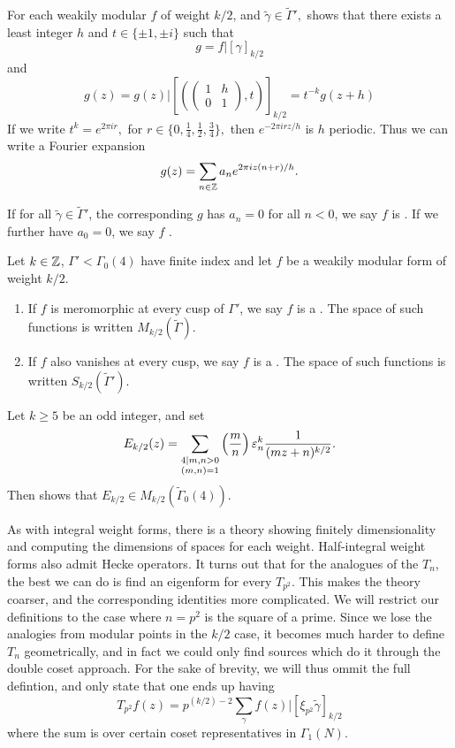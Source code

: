 \documentclass[12pt, a4paper]{report}
\begin{document}
For each weakily modular $f$ of weight $k/2$, and $\tilde{\gamma} \in \tilde{\Gamma}',$
\cite[page 180-182]{koblitz} shows that there exists a least integer $h$ and 
$t \in \{\pm 1, \pm i\}$ such that 
\[g = f | [\gamma]_{k/2} \]
and 
\[g(z) = g(z) | \left[ \left( \left(
        \begin{smallmatrix}
          1 & h \\ 0 & 1
        \end{smallmatrix}
\right), t \right) \right]_{k/2} = t^{-k}g(z+h) \]
If we write $t^k = e^{2\pi i r}, $ for $r \in \{0, \frac{1}{4}, \frac{1}{2},
\frac{3}{4}\}, $ then $e^{-2 \pi i r z / h}$ is $h$ periodic. Thus we can write
a Fourier expansion
\[g(z) = \sum\limits_{n \in {\mathbb Z}} a_n e^{2 \pi i z(n+r)/h}.\]

If for all $\tilde{\gamma} \in \tilde{\Gamma}'$, the corresponding $g$ has
$a_n = 0$ for all $n < 0$, we say $f$ is . 
If we further have $a_0 = 0$, we say $f$ .

\begin{defn}
  Let $k \in {\mathbb Z}$, $\Gamma' < \Gamma_0(4)$ have finite index and let $f$ be a
  weakily modular form of weight $k/2$.
  \begin{enumerate}
  \item If $f$ is meromorphic at every cusp of $\Gamma'$, we say $f$ is a
    . The space of such functions is written 
    $M_{k/2}(\tilde{\Gamma})$.
  \item If $f$ also vanishes at every cusp, we say $f$ is a . The space of such functions is written $S_{k/2}(\tilde{\Gamma}').$
  \end{enumerate}
\end{defn}

\begin{example}
  Let $k \geq 5$ be an odd integer, and set
   \[E_{k/2}(z) = \sum_{\substack{4 \mid m,n > 0 \\ (m,n) = 1}} \left(\frac{m}{n}\right) 
    \varepsilon_n^k \frac{1}{(mz + n)^{k/2}}.\]
  Then \cite[Page 186]{koblitz} shows that $E_{k/2} \in M_{k/2}(\tilde{\Gamma}_0(4)).$
\end{example}

As with integral weight forms, there is a theory showing finitely dimensionality
and computing the dimensions of spaces for each weight. Half-integral weight
forms also admit Hecke operators. It turns out that for the analogues of the
$T_n$, the best we can do is find an eigenform for every $T_{p^2}$. This makes
the theory coarser, and the corresponding identities more complicated. We will
restrict our definitions to the case where $n = p^2$ is the square of a prime. 
Since we lose the analogies from modular points in the $k/2$ case, it becomes
much harder to define $T_n$ geometrically, and in fact we could only find
sources which do it through the double coset approach. For the sake of brevity,
we will thus ommit the full defintion, and only state that one ends up having
\[T_{p^2}f(z) = p^{(k/2)-2} \sum_\gamma f(z) | [\xi_{p^2} \tilde{\gamma}]_{k/2}\]
where the sum is over certain coset representatives in $\Gamma_1(N).$
\end{document}
